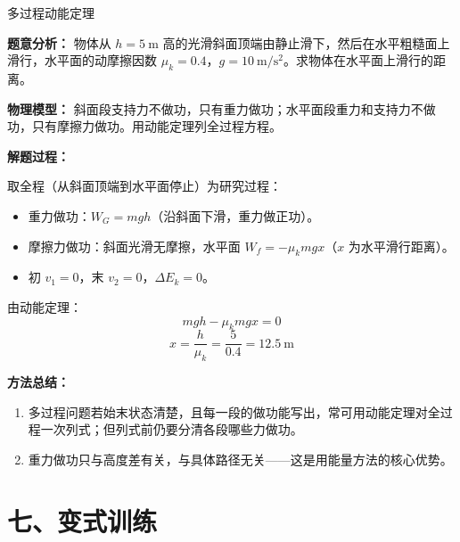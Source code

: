 \begin{examplebox}{多过程动能定理}

\textbf{题意分析：} 物体从 $h = 5\ \mathrm{m}$ 高的光滑斜面顶端由静止滑下，然后在水平粗糙面上滑行，水平面的动摩擦因数 $\mu_k = 0.4$，$g = 10\ \mathrm{m/s^2}$。求物体在水平面上滑行的距离。

\textbf{物理模型：} 斜面段支持力不做功，只有重力做功；水平面段重力和支持力不做功，只有摩擦力做功。用动能定理列全过程方程。

\begin{center}


\label{fig:example-work-multiprocess}
\end{center}

\textbf{解题过程：}

取全程（从斜面顶端到水平面停止）为研究过程：
\begin{itemize}
  \item 重力做功：$W_G = mgh$（沿斜面下滑，重力做正功）。
  \item 摩擦力做功：斜面光滑无摩擦，水平面 $W_f = -\mu_k mg x$（$x$ 为水平滑行距离）。
  \item 初 $v_1 = 0$，末 $v_2 = 0$，$\Delta E_k = 0$。
\end{itemize}

由动能定理：
\[
mgh - \mu_k mg x = 0
\]
\[
x = \frac{h}{\mu_k} = \frac{5}{0.4} = 12.5\ \mathrm{m}
\]

\textbf{方法总结：}
\begin{enumerate}
  \item 多过程问题若始末状态清楚，且每一段的做功能写出，常可用动能定理对全过程一次列式；但列式前仍要分清各段哪些力做功。
  \item 重力做功只与高度差有关，与具体路径无关——这是用能量方法的核心优势。
\end{enumerate}

\end{examplebox}

\section*{七、变式训练}


